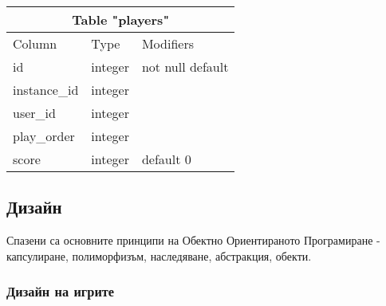 \documentclass[a4paper]{article}
\begin{document}
\begin{tabular} { | l | l | l | }
\multicolumn{3}{c}{Table "players"} \\
\hline
Column & Type & Modifiers \\
\hline
id & integer & not null default \\
instance\_id & integer & \\
user\_id     & integer & \\
play\_order  & integer & \\
score       & integer & default 0 \\
\hline
\end{tabular}

\subsection{Дизайн} 
Спазени са основните принципи на Обектно Ориентираното Програмиране \cite{oop} - капсулиране, полиморфизъм, наследяване, абстракция, обекти.

  \subsubsection{Дизайн на игрите}
  
\end{document}
